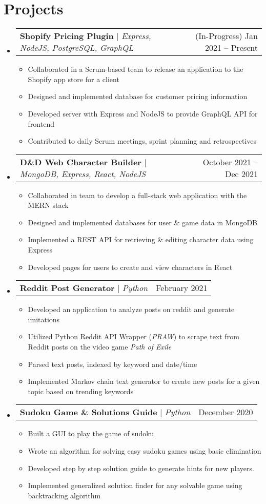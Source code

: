 \documentclass[letterpaper,11pt]{article}
\makeatletter
\newcommand{\resumeItem}[1]{
  \item\small{
    {#1 \vspace{-2pt}}
  }
}
\newcommand{\resumeProjectHeading}[2]{
    \item
    \begin{tabular*}{0.97\textwidth}{l@{\extracolsep{\fill}}r}
      \small#1 & #2 \\
    \end{tabular*}\vspace{-7pt}
}
\newcommand{\resumeSubHeadingListStart}{\begin{itemize}[leftmargin=0.15in, label={}]}
\newcommand{\resumeSubHeadingListEnd}{\end{itemize}}
\newcommand{\resumeItemListStart}{\begin{itemize}}
\newcommand{\resumeItemListEnd}{\end{itemize}\vspace{-5pt}}
\makeatother
\begin{document}
\section{Projects}
    \resumeSubHeadingListStart
      \resumeProjectHeading
          {\textbf{Shopify Pricing Plugin} $|$ \emph{Express, NodeJS, PostgreSQL, GraphQL}}{(In-Progress) Jan 2021 -- Present}
          \resumeItemListStart
            \resumeItem{Collaborated in a Scrum-based team to release an application to the Shopify app store for a client}
            \resumeItem{Designed and implemented database for customer pricing information}
            \resumeItem{Developed server with Express and NodeJS to provide GraphQL API for frontend}
            \resumeItem{Contributed to daily Scrum meetings, sprint planning and retrospectives}
          \resumeItemListEnd
      \resumeProjectHeading
          {\textbf{D\&D Web Character Builder} $|$ \emph{MongoDB, Express, React, NodeJS}}{October 2021 -- Dec 2021}
          \resumeItemListStart
            \resumeItem{Collaborated in team to develop a full-stack web application with the MERN stack}
            \resumeItem{Designed and implemented databases for user \& game data in MongoDB}
            \resumeItem{Implemented a REST API for retrieving \& editing character data using Express}
            \resumeItem{Developed pages for users to create and view characters in React}
          \resumeItemListEnd
      \resumeProjectHeading
          {\textbf{Reddit Post Generator} $|$ \emph{Python}}{February 2021}
          \resumeItemListStart
            \resumeItem{Developed an application to analyze posts on reddit and generate imitations}
            \resumeItem{Utilized Python Reddit API Wrapper (\emph{PRAW}) to scrape text from Reddit posts on the video game \emph{Path of Exile}}
            \resumeItem{Parsed text posts, indexed by keyword and date/time}
            \resumeItem{Implemented Markov chain text generator to create new posts for a given topic based on trending keywords}
          \resumeItemListEnd
      \resumeProjectHeading
          {\textbf{Sudoku Game \& Solutions Guide} $|$ \emph{Python}}{December 2020}
          \resumeItemListStart
            \resumeItem{Built a GUI to play the game of sudoku}
            \resumeItem{Wrote an algorithm for solving easy sudoku games using basic elimination}
            \resumeItem{Developed step by step solution guide to generate hints for new players.}
            \resumeItem{Implemented generalized solution finder for any solvable game using backtracking algorithm}
          \resumeItemListEnd
    \resumeSubHeadingListEnd
\end{document}
